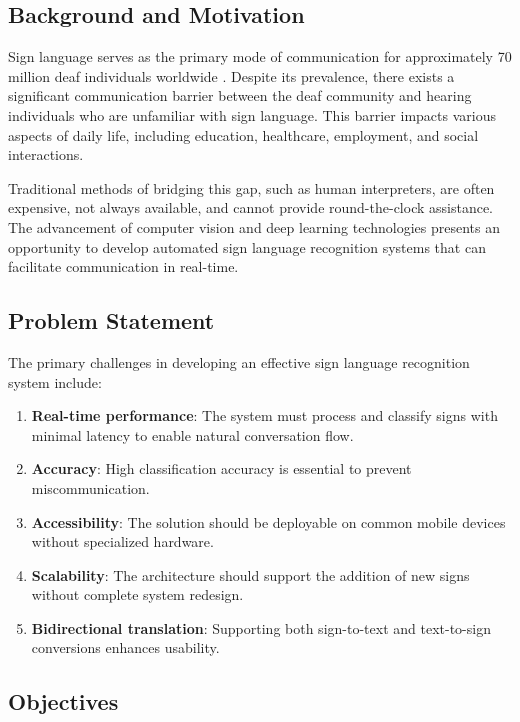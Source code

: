 \documentclass[conference]{IEEEtran}
\begin{document}
\subsection{Background and Motivation}

Sign language serves as the primary mode of communication for approximately 70 million deaf individuals worldwide \cite{wfd2023}. Despite its prevalence, there exists a significant communication barrier between the deaf community and hearing individuals who are unfamiliar with sign language. This barrier impacts various aspects of daily life, including education, healthcare, employment, and social interactions.

Traditional methods of bridging this gap, such as human interpreters, are often expensive, not always available, and cannot provide round-the-clock assistance. The advancement of computer vision and deep learning technologies presents an opportunity to develop automated sign language recognition systems that can facilitate communication in real-time.

\subsection{Problem Statement}

The primary challenges in developing an effective sign language recognition system include:

\begin{enumerate}
    \item \textbf{Real-time performance}: The system must process and classify signs with minimal latency to enable natural conversation flow.
    \item \textbf{Accuracy}: High classification accuracy is essential to prevent miscommunication.
    \item \textbf{Accessibility}: The solution should be deployable on common mobile devices without specialized hardware.
    \item \textbf{Scalability}: The architecture should support the addition of new signs without complete system redesign.
    \item \textbf{Bidirectional translation}: Supporting both sign-to-text and text-to-sign conversions enhances usability.
\end{enumerate}

\subsection{Objectives}
\end{document}
